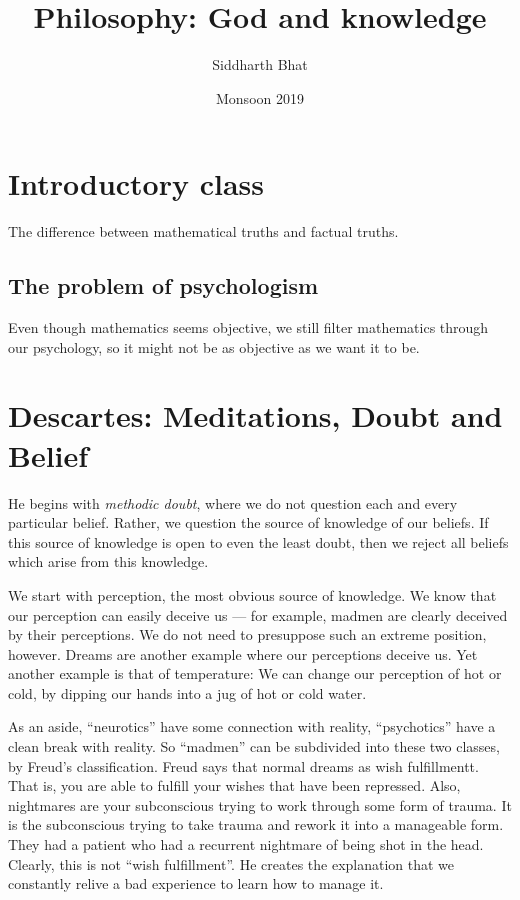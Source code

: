\documentclass[11pt]{book}
\title{Philosophy: God and knowledge}
\author{Siddharth Bhat}
\date{Monsoon 2019}
\begin{document}
\maketitle
\tableofcontents

\chapter{Introductory class}

The difference between mathematical truths and factual truths.

\section{The problem of psychologism}

Even though mathematics seems objective, we still filter
mathematics through our psychology, so it might not be
as objective as we want it to be.

\chapter{Descartes: Meditations, Doubt and Belief}

He begins with \textit{methodic doubt}, where we do not question each and
every particular belief. Rather, we question the source of knowledge of our
beliefs. If this source of knowledge is open to even the least doubt, then 
we reject all beliefs which arise from this knowledge.

We start with perception, the most obvious source of knowledge. We know that
our perception can easily deceive us --- for example, madmen are clearly
deceived by their perceptions. We do not need to presuppose such an
extreme position, however. Dreams are another example where our perceptions
deceive us. Yet another example is that of temperature: We can
change our perception of hot or cold, by dipping our hands into a
jug of hot or cold water.

As an aside, ``neurotics'' have some connection with reality, ``psychotics''
have a clean break with reality. So ``madmen'' can be subdivided into
these two classes, by Freud's classification. Freud says that normal
dreams as wish fulfillmentt. That is, you are able to fulfill your wishes
that have been repressed. Also, nightmares are your subconscious
trying to work through some form of trauma. It is the subconscious
trying to take trauma and rework it into a manageable form. They
had a patient who had a recurrent nightmare of being shot
in the head. Clearly, this is not ``wish fulfillment''.
He creates the explanation that we constantly relive a bad
experience to learn how to manage it.
\end{document}
